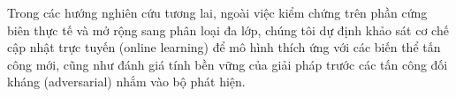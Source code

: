 Trong các hướng nghiên cứu tương lai, ngoài việc kiểm chứng trên phần cứng biên thực tế và mở rộng sang phân loại đa lớp, chúng tôi dự định khảo sát cơ chế cập nhật trực tuyến (online learning) để mô hình thích ứng với các biến thể tấn công mới, cũng như đánh giá tính bền vững của giải pháp trước các tấn công đối kháng (adversarial) nhắm vào bộ phát hiện.

